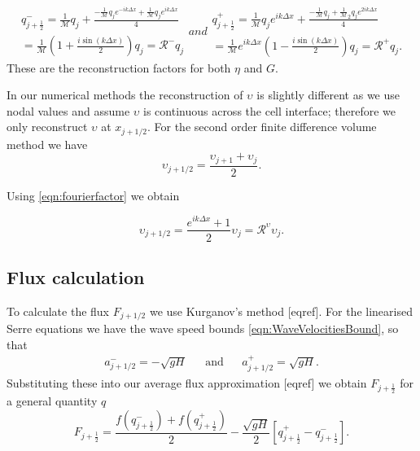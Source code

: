 \begin{subequations}
\label{eqn:RpmfactorFDVM}
\begin{multline}
q^-_{j+\frac{1}{2}} =\frac{1}{\mathcal{M}}{q}_j + \frac{- \frac{1}{\mathcal{M}}{q}_{j} e^{-ik\Delta x} + \frac{1}{\mathcal{M}}{q}_{j} e^{ik\Delta x}}{4} \\= \frac{1}{\mathcal{M}}\left(1  + \frac{i\sin\left(k\Delta x\right)}{2} \right)q_j =\mathcal{R}^- q_j
\end{multline}
and
\begin{multline}
q^+_{j+\frac{1}{2}} = \frac{1}{\mathcal{M}}{q}_{j}e^{ik\Delta x} + \frac{- \frac{1}{\mathcal{M}}{q}_{j} + \frac{1}{\mathcal{M}}_2{q}_{j}e^{2ik\Delta x} }{4} \\= \frac{1}{\mathcal{M}}e^{ik\Delta x}\left(1  - \frac{i\sin\left(k\Delta x\right)}{2} \right){q}_{j} = \mathcal{R}^+ q_j.
\end{multline}
\end{subequations}
These are the reconstruction factors for both $\eta$ and $G$.


In our numerical methods the reconstruction of $\upsilon$ is slightly different as we use nodal values and assume $\upsilon$ is continuous across the cell interface; therefore we only reconstruct $\upsilon$ at $x_{j+1/2}$. For the second order finite difference volume method we have
\begin{equation*}
\upsilon_{j + 1/2} = \frac{\upsilon_{j+1} + \upsilon_{j}}{2}.
\end{equation*}

Using \eqref{eqn:fourierfactor} we obtain

\begin{equation}
\label{eqn:2ndreconu}
\upsilon_{j + 1/2} = \frac{e^{ik\Delta x } + 1}{2} \upsilon_{j} = \mathcal{R}^\upsilon \upsilon_{j} .
\end{equation}
 

\subsection{Flux calculation}
To calculate the flux $F_{j+1/2}$ we use Kurganov's method \cite{Kurganov-etal-2001-707} [eqref].
For the linearised Serre equations we have the wave speed bounds \eqref{eqn:WaveVelocitiesBound}, so that
\begin{align}
a^-_{j+ 1/2} =  - \sqrt{g H}& &\text{and}& &a^+_{j+ 1/2} = \sqrt{g H}.
\end{align}
 Substituting these into our average flux approximation [eqref] we obtain $F_{j+\frac{1}{2}}$ for a general quantity $q$
\begin{equation}\label{eqn:HLL_fluxred}
F_{j+\frac{1}{2}} = \dfrac{ f\left(q^-_{j+\frac{1}{2}}\right) + f\left(q^+_{j+\frac{1}{2}}\right)}{ 2}  - \dfrac{ \sqrt{gH}}{ 2} \left [ q^+_{j+\frac{1}{2}} - q^-_{j+\frac{1}{2}} \right ].
\end{equation}

